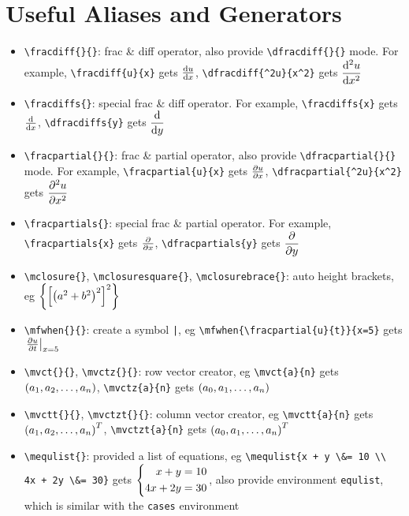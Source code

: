 \documentclass{article}
\begin{document}
\section{Useful Aliases and Generators}
\begin{itemize}
\item \lstinline`\fracdiff{}{}`: frac \& diff operator, also provide \lstinline`\dfracdiff{}{}` mode. For example, \lstinline`\fracdiff{u}{x}` gets ${\frac{\operatorname{d\!} {u}}{\operatorname{d\!} {x}}}$, \lstinline`\dfracdiff{^2u}{x^2}` gets ${\dfrac{\operatorname{d\!} {^2u}}{\operatorname{d\!} {x^2}}}$

\item \lstinline`\fracdiffs{}`: special frac \& diff operator. For example, \lstinline`\fracdiffs{x}` gets ${{\frac{\operatorname{d\!} {}}{\operatorname{d\!} {x}}}}$, \lstinline`\dfracdiffs{y}` gets ${{\dfrac{\operatorname{d\!} {}}{\operatorname{d\!} {y}}}}$

\item \lstinline`\fracpartial{}{}`: frac \& partial operator, also provide \lstinline`\dfracpartial{}{}` mode. For example, \lstinline`\fracpartial{u}{x}` gets ${\frac{\partial {u}}{\partial {x}}}$, \lstinline`\dfracpartial{^2u}{x^2}` gets ${\dfrac{\partial {^2u}}{\partial {x^2}}}$

\item \lstinline`\fracpartials{}`: special frac \& partial operator. For example, \lstinline`\fracpartials{x}` gets ${{\frac{\partial {}}{\partial {x}}}}$, \lstinline`\dfracpartials{y}` gets ${{\dfrac{\partial {}}{\partial {y}}}}$

\item \lstinline`\mclosure{}`, \lstinline`\mclosuresquare{}`, \lstinline`\mclosurebrace{}`: auto height brackets, eg ${\left\{ { {\left[ { {\left( {a^2 + b^2} \right)}^2 } \right]}^2 } \right\}}$

\item \lstinline`\mfwhen{}{}`: create a symbol \lstinline`|`, eg \lstinline`\mfwhen{\fracpartial{u}{t}}{x=5}` gets ${\left.{{\frac{\partial {u}}{\partial {t}}}} \right|}_{x=5}$

\item \lstinline`\mvct{}{}`, \lstinline`\mvctz{}{}`: row vector creator, eg \lstinline`\mvct{a}{n}` gets ${ ({a}_1, {a}_2, \ldots, {a}_{n}) }$, \lstinline`\mvctz{a}{n}` gets ${ ({a}_0, {a}_1, \ldots, {a}_{n}) }$

\item \lstinline`\mvctt{}{}`, \lstinline`\mvctzt{}{}`: column vector creator, eg \lstinline`\mvctt{a}{n}` gets ${ { ({a}_1, {a}_2, \ldots, {a}_{n}) }^T }$, \lstinline`\mvctzt{a}{n}` gets ${ { ({a}_0, {a}_1, \ldots, {a}_{n}) }^T }$

\item \lstinline`\mequlist{}`: provided a list of equations, eg \lstinline`\mequlist{x + y \&= 10 \\ 4x + 2y \&= 30}` gets ${\left\{ \begin{aligned} x + y &= 10 \\ 4x + 2y &= 30 \end{aligned} \right.}$, also provide environment \lstinline`equlist`, which is similar with the \lstinline`cases` environment
\end{itemize}

\end{document}
